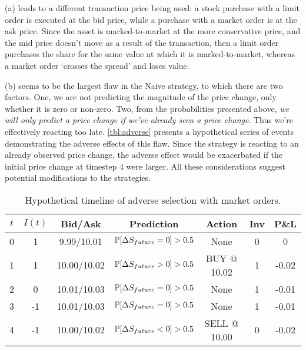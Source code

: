 (a) leads to a different transaction price being used: a stock purchase with a limit order is executed at the bid price, while a purchase with a market order is at the ask price. Since the asset is marked-to-market at the more conservative price, and the mid price doesn't move as a result of the transaction, then a limit order purchases the share for the same value at which it is marked-to-market, whereas a market order `crosses the spread' and loses value.

(b) seems to be the largest flaw in the Naive strategy, to which there are two factors. One, we are not predicting the magnitude of the price change, only whether it is zero or non-zero. Two, from the probabilities presented above, \emph{we will only predict a price change if we've already seen a price change}. Thus we're effectively reacting too late. \autoref{tbl:adverse} presents a hypothetical series of events demonstrating the adverse effects of this flaw. Since the strategy is reacting to an already observed price change, the adverse effect would be exacerbated if the initial price change at timestep 4 were larger. All these considerations suggest potential modifications to the strategies.

\begin{table}
\centering
{}
\begin{tabular}{@{} *{7}{c} @{}}
\toprule
$t$ & $I(t)$ & Bid/Ask & Prediction & Action & Inv & P\&L \\
\midrule
0 & 1 & \hphantom{1}9.99/10.01 & $\P[\Delta S_{future} = 0] > 0.5$ & None & 0 & 0 \\
1 & 1 & 10.00/10.02 & $\P[\Delta S_{future} > 0] > 0.5$ & BUY @ 10.02 & 1 & -0.02 \\
2 & 0 & 10.01/10.03 & $\P[\Delta S_{future} = 0] > 0.5$ & None & 1 & -0.01 \\
3 & -1 & 10.01/10.03 & $\P[\Delta S_{future} = 0] > 0.5$ & None & 1 & -0.01 \\
4 & -1 & 10.00/10.02 & $\P[\Delta S_{future} < 0] > 0.5$ & SELL @ 10.00 & 0 & -0.02 \\
\bottomrule
\end{tabular}
\caption[Hypothetical timeline of adverse selection with market orders]{Hypothetical timeline of adverse selection with market orders.}
\label{tbl:adverse}
\end{table}